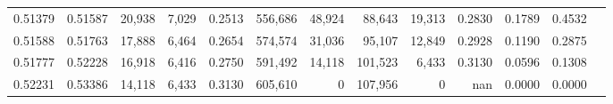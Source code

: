 \begin{tabular}{rrrrrrrrrrrrr}
0.51379 & 0.51587 & 20,938 & 7,029 &                                     0.2513 & 556,686 &  48,924 &  88,643 &  19,313 & 0.2830 & 0.1789 & 0.4532 \\
0.51588 & 0.51763 & 17,888 & 6,464 &                                     0.2654 & 574,574 &  31,036 &  95,107 &  12,849 & 0.2928 & 0.1190 & 0.2875 \\
0.51777 & 0.52228 & 16,918 & 6,416 &                                     0.2750 & 591,492 &  14,118 & 101,523 &   6,433 & 0.3130 & 0.0596 & 0.1308 \\
0.52231 & 0.53386 & 14,118 & 6,433 &                                     0.3130 & 605,610 &       0 & 107,956 &       0 &    nan & 0.0000 & 0.0000 \\
\bottomrule
\end{tabular}
